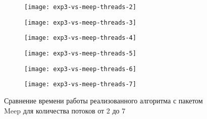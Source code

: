 \documentclass[14pt,a4paper]{extarticle} %
\begin{document}
\begin{figure}
         \centering
         \begin{subfigure}[b]{0.4\textwidth}
                 \texttt{[image: exp3-vs-meep-threads-2]}
         \end{subfigure}
         \begin{subfigure}[b]{0.4\textwidth}
                 \texttt{[image: exp3-vs-meep-threads-3]}
         \end{subfigure}

         \begin{subfigure}[b]{0.4\textwidth}
                 \texttt{[image: exp3-vs-meep-threads-4]}
         \end{subfigure}
         \begin{subfigure}[b]{0.4\textwidth}
                 \texttt{[image: exp3-vs-meep-threads-5]}
         \end{subfigure}

         \begin{subfigure}[b]{0.4\textwidth}
                 \texttt{[image: exp3-vs-meep-threads-6]}
         \end{subfigure}
         \begin{subfigure}[b]{0.4\textwidth}
                 \texttt{[image: exp3-vs-meep-threads-7]}
         \end{subfigure}

          \caption{Сравнение времени работы реализованного алгоритма с пакетом Meep для количества потоков от 2 до 7}
         \label{fig:fdtd-conv-to-meep1}
\end{figure}
\end{document}
